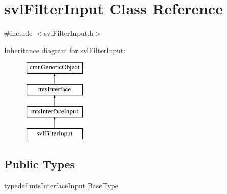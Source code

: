 \hypertarget{classsvl_filter_input}{\section{svl\-Filter\-Input Class Reference}
\label{classsvl_filter_input}
}


{\ttfamily \#include $<$svl\-Filter\-Input.\-h$>$}

Inheritance diagram for svl\-Filter\-Input\-:\begin{figure}[H]
\begin{center}
\leavevmode
\includegraphics[height=4.000000cm]{d9/d80/classsvl_filter_input}
\end{center}
\end{figure}
\subsection*{Public Types}
\begin{DoxyCompactItemize}
\item 
typedef \hyperlink{classmts_interface_input}{mts\-Interface\-Input} \hyperlink{classsvl_filter_input_a1439c55646b38d500a6eaf9a761bf5a2}{Base\-Type}
\end{DoxyCompactItemize}

